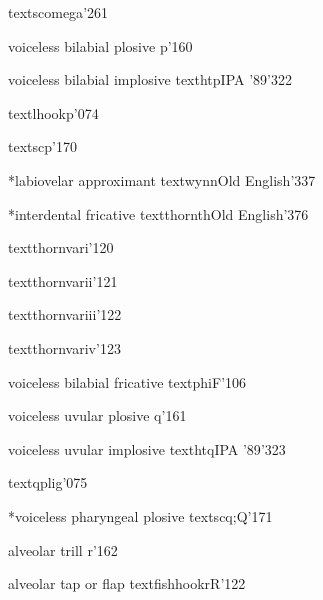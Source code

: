 %
  {}%
  {\tbs textscomega}{}{\PSG}{'261}

%
  {voiceless bilabial plosive}%
  {p}{}{\ipaall}{'160}

%
  {voiceless bilabial implosive}%
  {\tbs texthtp}{}{IPA '89}{'322}

%
  {}%
  {\tbs textlhookp}{}{\PSG}{'074}

%
  {}%
  {\tbs textscp}{}{\PSG}{'170}

%
  {*labiovelar approximant}%
  {\tbs textwynn}{}{Old English}{'337}

%
  {*interdental fricative}%
  {\tbs textthorn}{\tbs th}{Old English}{'376}

%
  {}%
  {\tbs textthornvari}{}{\PSG}{'120}

%
  {}%
  {\tbs textthornvarii}{}{\PSG}{'121}

%
  {}%
  {\tbs textthornvariii}{}{\PSG}{'122}

%
  {}%
  {\tbs textthornvariv}{}{\PSG}{'123}

%
  {voiceless bilabial fricative}%
  {\tbs textphi}{F}{\ipaall}{'106}

%
  {voiceless uvular plosive}%
  {q}{}{\ipaall}{'161}

%
  {voiceless uvular implosive}%
  {\tbs texthtq}{}{IPA '89}{'323}

%
  {}%
  {\tbs textqplig}{}{\PSG}{'075}

%
  {*voiceless pharyngeal plosive}%
  {\tbs textscq}{\tbs;Q}{}{'171}%

%
  {alveolar trill}%
  {r}{}{\ipaall}{'162}

%
  {alveolar tap or flap}%
  {\tbs textfishhookr}{R}{\ipaall}{'122}

